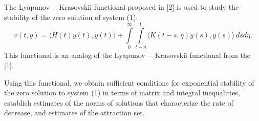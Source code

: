 \documentclass[12pt]{llncs}
\begin{document}
The Lyapunov~-- Krasovskii functional proposed in [2] is used to study the stability of the zero solution of system (1): 
$$
v(t,y) = \langle H(t)y(t),
y(t)\rangle
 +\int\limits^\infty_0 \int\limits^t_{t-\eta}
 \langle K(t-s,\eta)y(s), y(s) \rangle \, dsd\eta.
$$
This functional is an analog of the Lyapunov~-- Krasovskii functional from the [1].

Using this functional, we obtain sufficient conditions for exponential stability of the 
zero solution to system (1) in terms of matrix and integral inequalities, establish estimates of the norms 
of solutions that characterize the rate of decrease, and estimates of the attraction set.  

  \centering

%

\end{document}
